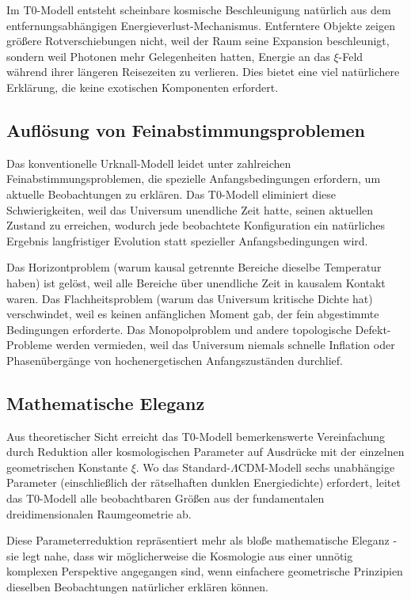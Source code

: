 \documentclass[12pt,a4paper]{article}
\begin{document}
	Im T0-Modell entsteht scheinbare kosmische Beschleunigung natürlich aus dem entfernungsabhängigen Energieverlust-Mechanismus. Entferntere Objekte zeigen größere Rotverschiebungen nicht, weil der Raum seine Expansion beschleunigt, sondern weil Photonen mehr Gelegenheiten hatten, Energie an das $\xi$-Feld während ihrer längeren Reisezeiten zu verlieren. Dies bietet eine viel natürlichere Erklärung, die keine exotischen Komponenten erfordert.
	
	\subsection{Auflösung von Feinabstimmungsproblemen}
	
	Das konventionelle Urknall-Modell leidet unter zahlreichen Feinabstimmungsproblemen, die spezielle Anfangsbedingungen erfordern, um aktuelle Beobachtungen zu erklären. Das T0-Modell eliminiert diese Schwierigkeiten, weil das Universum unendliche Zeit hatte, seinen aktuellen Zustand zu erreichen, wodurch jede beobachtete Konfiguration ein natürliches Ergebnis langfristiger Evolution statt spezieller Anfangsbedingungen wird.
	
	Das Horizontproblem (warum kausal getrennte Bereiche dieselbe Temperatur haben) ist gelöst, weil alle Bereiche über unendliche Zeit in kausalem Kontakt waren. Das Flachheitsproblem (warum das Universum kritische Dichte hat) verschwindet, weil es keinen anfänglichen Moment gab, der fein abgestimmte Bedingungen erforderte. Das Monopolproblem und andere topologische Defekt-Probleme werden vermieden, weil das Universum niemals schnelle Inflation oder Phasenübergänge von hochenergetischen Anfangszuständen durchlief.
	
	\subsection{Mathematische Eleganz}
	
	Aus theoretischer Sicht erreicht das T0-Modell bemerkenswerte Vereinfachung durch Reduktion aller kosmologischen Parameter auf Ausdrücke mit der einzelnen geometrischen Konstante $\xi$. Wo das Standard-$\Lambda$CDM-Modell sechs unabhängige Parameter (einschließlich der rätselhaften dunklen Energiedichte) erfordert, leitet das T0-Modell alle beobachtbaren Größen aus der fundamentalen dreidimensionalen Raumgeometrie ab.
	
	Diese Parameterreduktion repräsentiert mehr als bloße mathematische Eleganz - sie legt nahe, dass wir möglicherweise die Kosmologie aus einer unnötig komplexen Perspektive angegangen sind, wenn einfachere geometrische Prinzipien dieselben Beobachtungen natürlicher erklären können.
	
\end{document}
